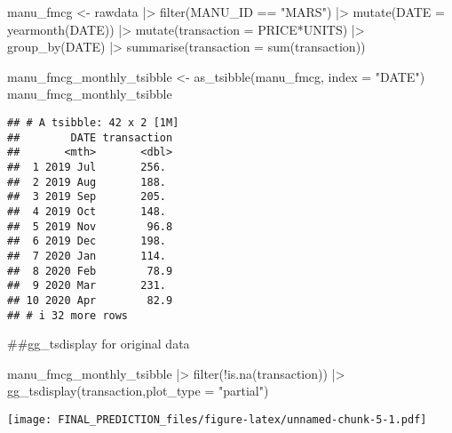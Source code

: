 \documentclass[
]{article}
\newenvironment{Shaded}{\begin{snugshade}}{\end{snugshade}}
\newcommand{\AttributeTok}[1]{\textcolor[rgb]{0.77,0.63,0.00}{#1}}
\newcommand{\FunctionTok}[1]{\textcolor[rgb]{0.00,0.00,0.00}{#1}}
\newcommand{\NormalTok}[1]{#1}
\newcommand{\OtherTok}[1]{\textcolor[rgb]{0.56,0.35,0.01}{#1}}
\newcommand{\SpecialCharTok}[1]{\textcolor[rgb]{0.00,0.00,0.00}{#1}}
\newcommand{\StringTok}[1]{\textcolor[rgb]{0.31,0.60,0.02}{#1}}
\begin{document}
\begin{Shaded}
\begin{Highlighting}[]
\NormalTok{manu\_fmcg }\OtherTok{\textless{}{-}}\NormalTok{ rawdata }\SpecialCharTok{|\textgreater{}} \FunctionTok{filter}\NormalTok{(MANU\_ID }\SpecialCharTok{==} \StringTok{"MARS"}\NormalTok{) }\SpecialCharTok{|\textgreater{}} 
                        \FunctionTok{mutate}\NormalTok{(}\AttributeTok{DATE =} \FunctionTok{yearmonth}\NormalTok{(DATE)) }\SpecialCharTok{|\textgreater{}}
                        \FunctionTok{mutate}\NormalTok{(}\AttributeTok{transaction =}\NormalTok{ PRICE}\SpecialCharTok{*}\NormalTok{UNITS) }\SpecialCharTok{|\textgreater{}}  
                        \FunctionTok{group\_by}\NormalTok{(DATE) }\SpecialCharTok{|\textgreater{}}
                        \FunctionTok{summarise}\NormalTok{(}\AttributeTok{transaction =} \FunctionTok{sum}\NormalTok{(transaction))}

\NormalTok{manu\_fmcg\_monthly\_tsibble }\OtherTok{\textless{}{-}} \FunctionTok{as\_tsibble}\NormalTok{(manu\_fmcg, }\AttributeTok{index =} \StringTok{"DATE"}\NormalTok{)}
\NormalTok{manu\_fmcg\_monthly\_tsibble}
\end{Highlighting}
\end{Shaded}

\begin{verbatim}
## # A tsibble: 42 x 2 [1M]
##        DATE transaction
##       <mth>       <dbl>
##  1 2019 Jul       256. 
##  2 2019 Aug       188. 
##  3 2019 Sep       205. 
##  4 2019 Oct       148. 
##  5 2019 Nov        96.8
##  6 2019 Dec       198. 
##  7 2020 Jan       114. 
##  8 2020 Feb        78.9
##  9 2020 Mar       231. 
## 10 2020 Apr        82.9
## # i 32 more rows
\end{verbatim}

\#\#gg\_tsdisplay for original data

\begin{Shaded}
\begin{Highlighting}[]
\NormalTok{manu\_fmcg\_monthly\_tsibble }\SpecialCharTok{|\textgreater{}} \FunctionTok{filter}\NormalTok{(}\SpecialCharTok{!}\FunctionTok{is.na}\NormalTok{(transaction)) }\SpecialCharTok{|\textgreater{}}                                                                                \FunctionTok{gg\_tsdisplay}\NormalTok{(transaction,}\AttributeTok{plot\_type =} \StringTok{"partial"}\NormalTok{)}
\end{Highlighting}
\end{Shaded}

\texttt{[image: FINAL\_PREDICTION\_files/figure-latex/unnamed-chunk-5-1.pdf]}
\end{document}
